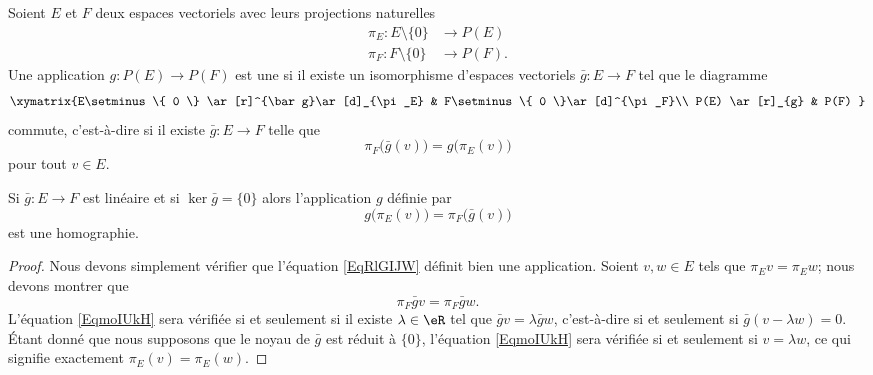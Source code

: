 \begin{definition}      \label{DEFooKWSMooXvOeEP}
    Soient \( E\) et \( F\) deux espaces vectoriels avec leurs projections naturelles
    \begin{subequations}
        \begin{align}
            \pi_E\colon E\setminus\{ 0 \}&\to P(E)\\
            \pi_F\colon F\setminus\{ 0 \}&\to P(F).
        \end{align}
    \end{subequations}
    Une application \( g\colon P(E)\to P(F)\) est une  si il existe un isomorphisme d'espaces vectoriels \( \bar g\colon E\to F\) tel que le diagramme
    \begin{equation}
        \xymatrix{%
        E\setminus\{ 0 \} \ar[r]^{\bar g}\ar[d]_{\pi_E}        &   F\setminus\{ 0 \}\ar[d]^{\pi_F}\\
           P(E) \ar[r]_{g}   &   P(F)
           }
    \end{equation}
    commute, c'est-à-dire si il existe \( \bar g\colon E\to F\) telle que
    \begin{equation}        \label{EQooSEFWooRpjLxt}
        \pi_F\big( \bar g(v) \big)=g\big( \pi_E(v) \big)
    \end{equation}
    pour tout \( v\in E\).
\end{definition}

\begin{lemma}
    Si \( \bar g\colon E\to F\) est linéaire et si \( \ker\bar g=\{ 0 \}\) alors l'application \( g\) définie par
    \begin{equation}        \label{EqRlGIJW}
        g\big( \pi_E(v) \big)=\pi_F\big( \bar g(v) \big)
    \end{equation}
    est une homographie.
\end{lemma}

\begin{proof}
    Nous devons simplement vérifier que l'équation \eqref{EqRlGIJW} définit bien une application. Soient \( v,w\in E\) tels que \( \pi_Ev=\pi_Ew\); nous devons montrer que
    \begin{equation}        \label{EqmoIUkH}
        \pi_F\bar gv=\pi_F\bar gw.
    \end{equation}
    L'équation \eqref{EqmoIUkH} sera vérifiée si et seulement si il existe \( \lambda\in\eR\) tel que \( \bar gv=\lambda\bar gw\), c'est-à-dire si et seulement si \( \bar g(v-\lambda w)=0\). Étant donné que nous supposons que le noyau de \( \bar g\) est réduit à \( \{ 0 \}\), l'équation \eqref{EqmoIUkH} sera vérifiée si et seulement si \( v=\lambda w\), ce qui signifie exactement \( \pi_E(v)=\pi_E(w)\).
\end{proof}

